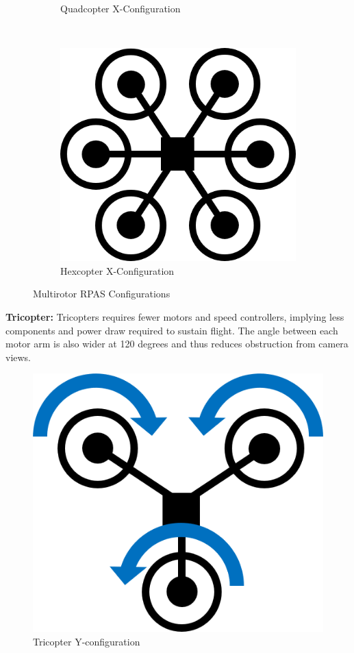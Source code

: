 \begin{figure}[H]
\begin{subfigure}[b]{0.3\textwidth}
        \caption{Quadcopter X-Configuration}
        \label{fig:quadcopter-x}
    \end{subfigure}
    ~
    \begin{subfigure}[b]{0.3\textwidth}
        \centering
        \includegraphics[scale=0.4]{img/drone_hexconfig}
        \caption{Hexcopter X-Configuration}
        \label{fig:hexcopter-x}
    \end{subfigure}
    
    \caption{Multirotor RPAS Configurations}
    \label{fig:rpas_configs}
\end{figure}

\textbf{Tricopter:} Tricopters requires fewer motors and speed controllers, implying less components and power draw required to sustain flight. The angle between each motor arm is also wider at 120 degrees and thus reduces obstruction from camera views. 

\begin{figure}[h]
    \centering
    \includegraphics[scale=0.4]{img/drone_yconfigt}
    \caption{Tricopter Y-configuration}
    \label{fig:tricopter-y-t}
\end{figure}

